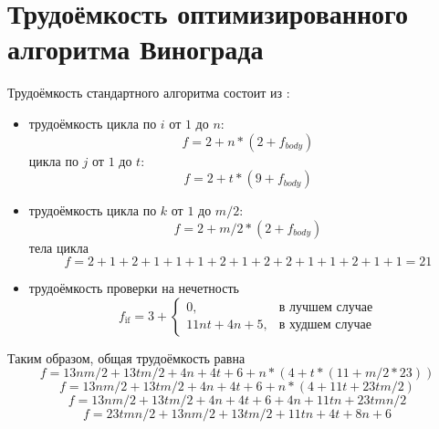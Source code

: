 \section{Трудоёмкость оптимизированного алгоритма Винограда}
Трудоёмкость стандартного алгоритма состоит из :
\begin{itemize}
	 переменных: \begin{equation*}f = 3\end{equation*}
	 памяти и инициализация векторов:  \begin{equation}f = 13nm/2 + 13tm/2 + 4n + 4t + 4 \end{equation}
	\item трудоёмкость цикла по \(i\) от \( 1 \) до \(n \): \begin{equation}f = 2 + n * (2 + f_{body})  \end{equation}
	 цикла по \(j\) от \( 1 \) до \(t \): \begin{equation}f = 2 + t * (9 + f_{body})  \end{equation}
	\item трудоёмкость цикла по \(k\) от \( 1 \) до \(m / 2 \): \begin{equation}f = 2 + m/2 * (2 + f_{body})  \end{equation}
	 тела цикла  \begin{equation}f = 2 + 1 + 2 + 1 + 1 + 1 + 2 + 1 + 2 + 2 + 1 + 1 + 2 + 1 + 1 = 21 \end{equation}
	\item трудоёмкость проверки на нечетность
		\begin{equation}\label{eq:if_complexity}
		f_{\text{if}} = 3 + \begin{cases}
			0, & \text{в лучшем случае} \\
			11nt + 4n + 5, & \text{в худшем случае}
		\end{cases}
	\end{equation}
\end{itemize}

Таким образом, общая трудоёмкость равна
\begin{equation}f = 13nm/2 + 13tm/2 + 4n + 4t + 6 + n * (4 + t * (11 + m/2 * 23)) \end{equation}
\begin{equation}f = 13nm/2 + 13tm/2 + 4n + 4t + 6 + n * (4 + 11t + 23tm/2) \end{equation}
\begin{equation}f = 13nm/2 + 13tm/2 + 4n + 4t + 6 + 4n + 11tn + 23tmn/2 \end{equation}
\begin{equation}f = 23tmn/2 + 13nm/2 + 13tm/2 + 11tn + 4t + 8n + 6 \end{equation}

